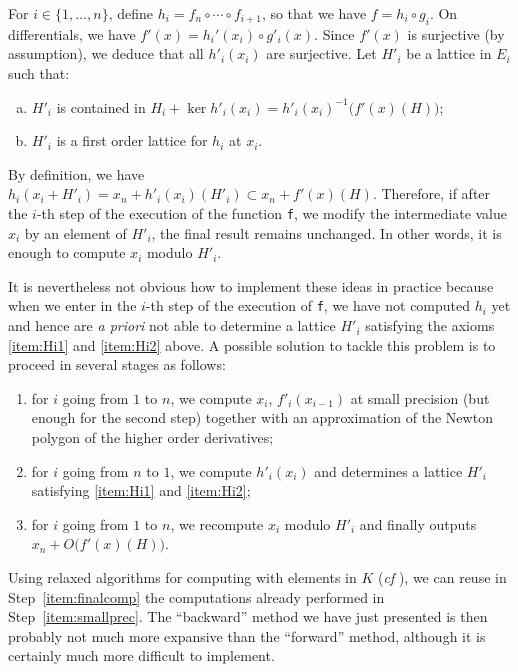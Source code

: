 \documentclass{lms}
\begin{document}
For $i \in \{1, \ldots, n\}$, define $h_i = f_n \circ \cdots \circ 
f_{i+1}$, so that we have $f = h_i \circ g_i$. On differentials, we 
have $f'(x) = h_i'(x_i) \circ g'_i(x)$. Since $f'(x)$ is surjective (by 
assumption), we deduce that all $h'_i(x_i)$ are surjective. Let $H'_i$ 
be a lattice in $E_i$ such that:
\begin{enumerate}[(a)] 
\item \label{item:Hi1}
$H'_i$ is contained in $H_i + \ker h'_i(x_i) = h'_i(x_i)^{-1}
\big(f'(x)(H)\big)$;
\item \label{item:Hi2}
$H'_i$ is a first order lattice for $h_i$ at $x_i$.
\end{enumerate}
By definition, we have
$h_i(x_i + H'_i) = x_n + h'_i(x_i)(H'_i) \subset x_n + f'(x)(H)$.
Therefore, if after the $i$-th step of the execution of the function
{\tt f}, we modify the intermediate value $x_i$ by an element of
$H'_i$, the final result remains unchanged. In other words, it is
enough to compute $x_i$ modulo $H'_i$.

It is nevertheless not obvious how to implement these ideas in practice
because when we enter in the $i$-th step of the execution of {\tt f},
we have not computed $h_i$ yet and hence are \emph{a priori} not able
to determine a lattice $H'_i$ satisfying the axioms \eqref{item:Hi1}
and \eqref{item:Hi2} above.
A possible solution to tackle this problem is to proceed in several
stages as follows: 
\begin{enumerate}[(1)]
\item \label{item:smallprec}
for $i$ going from $1$ to $n$, we compute $x_i$, $f'_i(x_{i-1})$ 
at small precision (but enough for the second step) together with an
approximation of the Newton polygon of the higher order derivatives;
\item \label{item:determineHi}
for $i$ going from $n$ to $1$, we compute $h'_i(x_i)$ and
determines a lattice $H'_i$ satisfying \eqref{item:Hi1} and 
\eqref{item:Hi2};
\item \label{item:finalcomp}
for $i$ going from $1$ to $n$, we recompute $x_i$ modulo $H'_i$
and finally outputs $x_n + O\big(f'(x)(H)\big)$.
\end{enumerate}
Using relaxed algorithms for computing with elements in $K$ (\emph{cf} 
\cite{}), we can reuse in Step~\eqref{item:finalcomp} the computations 
already performed in Step~\eqref{item:smallprec}. The ``backward'' method 
we have just presented is then probably not much more expansive than the 
``forward'' method, although it is certainly much more difficult to 
implement. 
\end{document}
